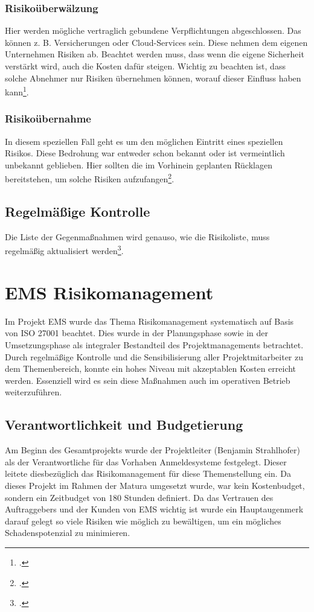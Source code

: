 \subsubsection{Risikoüberwälzung}
Hier werden mögliche vertraglich gebundene Verpflichtungen abgeschlossen. Das können z. B. Versicherungen oder Cloud-Services sein. Diese nehmen dem eigenen Unternehmen Risiken ab. Beachtet werden muss, dass wenn die eigene Sicherheit verstärkt wird, auch die Kosten dafür steigen. Wichtig zu beachten ist, dass solche Abnehmer nur Risiken übernehmen können, worauf dieser Einfluss haben kann\footcite{risikomanagement-diplomarbeit}.

\subsubsection{Risikoübernahme}
In diesem speziellen Fall geht es um den möglichen Eintritt eines speziellen Risikos. Diese Bedrohung war entweder schon bekannt oder ist vermeintlich unbekannt geblieben. Hier sollten die im Vorhinein geplanten Rücklagen bereitstehen, um solche Risiken aufzufangen\footcite{risikomanagement-diplomarbeit}.

\subsection{Regelmäßige Kontrolle}
Die Liste der Gegenmaßnahmen wird genauso, wie die Risikoliste, muss regelmäßig aktualisiert werden\footcite{bva-risikomanagement}.  

\section{EMS Risikomanagement}
Im Projekt EMS wurde das Thema Risikomanagement systematisch auf Basis von ISO 27001 beachtet. Dies wurde in der Planungsphase sowie in der Umsetzungsphase als integraler Bestandteil des Projektmanagements betrachtet. Durch regelmäßige Kontrolle und die Sensibilisierung aller Projektmitarbeiter zu dem Themenbereich, konnte ein hohes Niveau mit akzeptablen Kosten erreicht werden. Essenziell wird es sein diese Maßnahmen auch im operativen Betrieb weiterzuführen.

\subsection{Verantwortlichkeit und Budgetierung}
Am Beginn des Gesamtprojekts wurde der Projektleiter (Benjamin Strahlhofer) als der Verantwortliche für das Vorhaben Anmeldesysteme festgelegt. Dieser leitete diesbezüglich das Risikomanagement für diese Themenstellung ein.
Da dieses Projekt im Rahmen der Matura umgesetzt wurde, war kein Kostenbudget, sondern ein Zeitbudget von 180 Stunden definiert. Da das Vertrauen des Auftraggebers und der Kunden von EMS wichtig ist wurde ein Hauptaugenmerk darauf gelegt so viele Risiken wie möglich zu bewältigen, um ein mögliches Schadenspotenzial zu minimieren.

